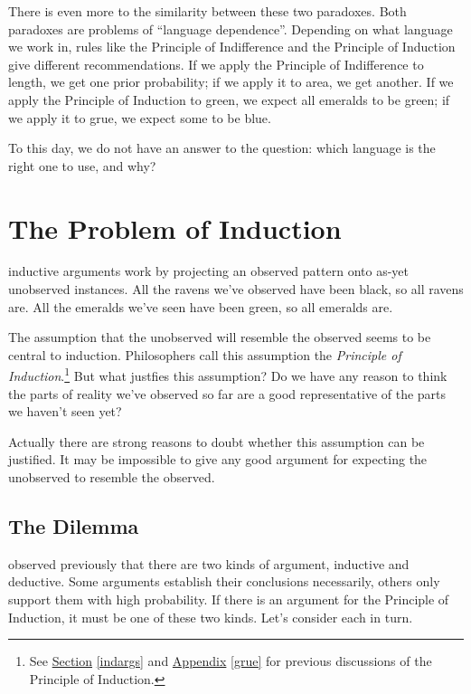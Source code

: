 \documentclass[justified]{tufte-book}
\begin{document}
There is even more to the similarity between these two paradoxes. Both paradoxes are problems of ``language dependence''. Depending on what language we work in, rules like the Principle of Indifference and the Principle of Induction give different recommendations. If we apply the Principle of Indifference to length, we get one prior probability; if we apply it to area, we get another. If we apply the Principle of Induction to green, we expect all emeralds to be green; if we apply it to grue, we expect some to be blue.

To this day, we do not have an answer to the question: which language is the right one to use, and why?

\hypertarget{the-problem-of-induction}{%
\chapter{The Problem of Induction}\label{the-problem-of-induction}}

 inductive arguments work by projecting an observed pattern onto as-yet unobserved instances. All the ravens we've observed have been black, so all ravens are. All the emeralds we've seen have been green, so all emeralds are.

The assumption that the unobserved will resemble the observed seems to be central to induction. Philosophers call this assumption the \emph{Principle of Induction}.\footnote{See \protect\hyperlink{indargs}{Section} \ref{indargs} and \protect\hyperlink{grue}{Appendix} \ref{grue} for previous discussions of the Principle of Induction.} But what justfies this assumption? Do we have any reason to think the parts of reality we've observed so far are a good representative of the parts we haven't seen yet?

Actually there are strong reasons to doubt whether this assumption can be justified. It may be impossible to give any good argument for expecting the unobserved to resemble the observed.

\hypertarget{the-dilemma}{%
\section*{The Dilemma}\label{the-dilemma}}

 observed previously that there are two kinds of argument, inductive and deductive. Some arguments establish their conclusions necessarily, others only support them with high probability. If there is an argument for the Principle of Induction, it must be one of these two kinds. Let's consider each in turn.
\end{document}
